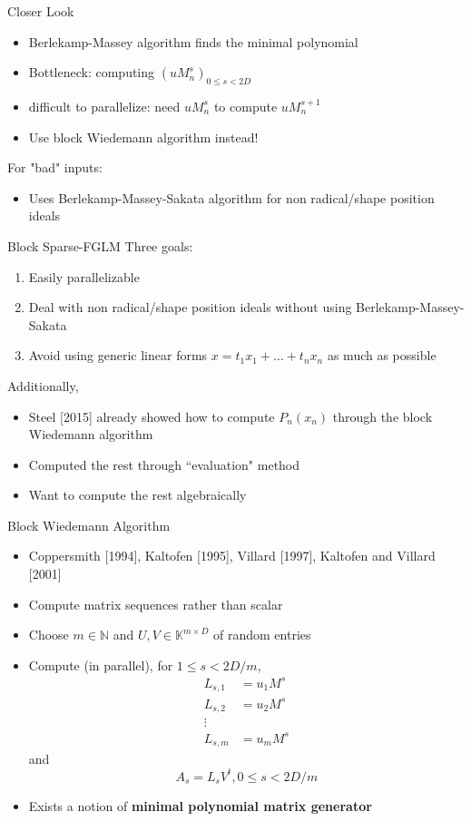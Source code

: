 \documentclass{beamer}
\begin{document}
\begin{frame}{Closer Look}
	\begin{itemize}
		\item Berlekamp-Massey algorithm finds the minimal polynomial
		\item Bottleneck: computing $(u M_n^s)_{0 \le s < 2D}$
		\item difficult to parallelize: need $uM_n^{s}$ to compute $uM_n^{s+1}$
		\item Use block Wiedemann algorithm instead!
		
	\end{itemize}
	For "bad" inputs:
	\begin{itemize}
		\item Uses Berlekamp-Massey-Sakata algorithm for non radical/shape position ideals
	\end{itemize}
\end{frame}

\begin{frame}{Block Sparse-FGLM}
	Three goals:
	\begin{enumerate}
		\item Easily parallelizable
		\item Deal with non radical/shape position ideals without using Berlekamp-Massey-Sakata
		\item Avoid using generic linear forms $x = t_1 x_1 + \dots + t_n x_n$ as much
		as possible
	\end{enumerate}
	\pause
	Additionally,
	\begin{itemize}
		\item Steel [2015] already showed how to compute $P_n(x_n)$ through the block Wiedemann algorithm
		\item Computed the rest through ``evaluation" method
		\item Want to compute the rest algebraically
	\end{itemize}
\end{frame}

\begin{frame}{Block Wiedemann Algorithm}
	\begin{itemize}
		\item Coppersmith [1994], Kaltofen [1995], Villard [1997], Kaltofen and Villard [2001]
		\item Compute matrix sequences
		rather than scalar
		\item Choose $m \in \mathbb{N}$ and
		$U,V \in \mathbb{K}^{m \times D}$ of random entries
		\item Compute (in parallel),
		for $1 \le s < 2D/m$,
		\begin{align*}
		L_{s,1} &= u_1 M^s\\
		L_{s,2} &= u_2 M^s\\
		\vdots\\
		L_{s,m} &= u_m M^s
		\end{align*}
		and
		$$ A_s = L_s V^t, 0\le s < 2D/m$$
		\item Exists a notion of \textbf{minimal polynomial matrix generator}
		
	\end{itemize}
	
\end{frame}
\end{document}
